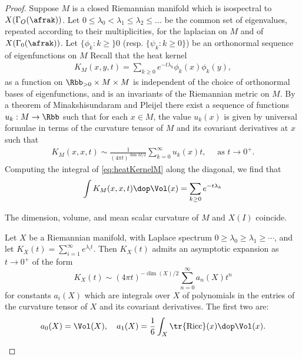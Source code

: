 \begin{proof}
  Suppose $M$ is a closed Riemannian manifold which is isospectral to $X(\Gamma_O(\afrak))$.
  Let $0 \leq \lambda_0 <\lambda_1 \leq \lambda_2 \leq \dots $ be the common set of eigenvalues, repeated according to their multiplicities, for the laplacian on $M$ and of $X(\Gamma_0(\afrak))$.
  Let $\{\phi_k: k\geq \}0$ (resp. $\{\psi_k: k\geq 0\}$) be an orthonormal sequence of eigenfunctions on $M$ %
  Recall that the heat kernel
  \begin{align}\label{eq:heatKernelM}
    K_M (x,y,t) = \sum_{k\geq 0} e^{-t \lambda_k}\phi_k(x)\phi_k(y), %
  \end{align}
  as a function on $\Rbb_{>0} \times M\times M$  %
  is independent of the choice of orthonormal bases of eigenfunctions, and is an  invariants of the Riemannian metric on $M$. By a theorem of Minakshisundaram and Pleijel \cite{Minakshisundaram.Pleijel-[PropertiesEigenfunctionsLaplaceoperator]1949} there exist a sequence of functions $u_k : M \to \Rbb$ such that for each $x \in M$, the value $u_k(x)$ is given by universal formulae in terms of the curvature tensor of $M$ and its covariant derivatives at $x$ such that
  \begin{align}
    K_M(x,x,t) \sim \frac{1}{(4\pi t)^{\dim M /2 }} \sum_{k=0}^\infty u_k(x) t, \quad \text{ as $t\to 0^+$.}
  \end{align}
  Computing the integral of \ref{eq:heatKernelM} along the diagonal, we find that
  \begin{align}
    \int K_M (x,x,t) \dop \Vol(x)  = \sum_{k\geq 0 }e^{-t \lambda_k} 
  \end{align}




  \begin{claim}\label{claim:heat}
    The dimension, volume, and mean scalar curvature of $M$ and $X(I)$ coincide.
  \end{claim}



  \begin{lemma}
    Let $X$ be a Riemannian manifold, with Laplace spectrum $0\geq \lambda_0 \geq \lambda_1 \geq \cdots$, and let $K_X(t)=\sum_{i=1}^\infty e^{\lambda_i t}$. Then $K_X(t)$ admits an asymptotic expansion as $t\to 0^+$ of the form
    \[ K_X(t) \sim (4\pi t)^{-\dim(X)/2} \sum_{n=0}^\infty a_n(X) t^n \]
    for constants $a_i(X)$ which are integrals over $X$ of polynomials in the entries of the curvature tensor of $X$ and its covariant derivatives. The first two are:
    \[a_0(X) = \Vol(X),\quad a_1(X) = \frac{1}{6} \int_X \tr {\rm Ricc} (x) \dop \Vol(x).\]
  \end{lemma}


\end{proof}
